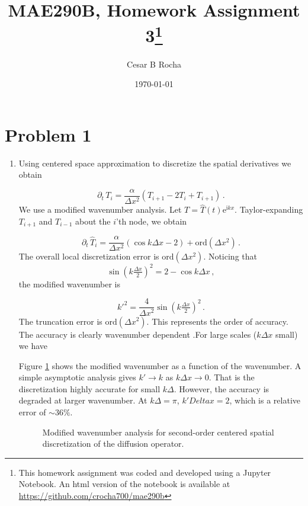 \documentclass[11pt]{article}
\title{MAE290B, Homework Assignment 3\footnote{This homework assignment was coded and developed using a Jupyter Notebook. An html version of the notebook is available at \href{https://github.com/crocha700/mae290b}{https://github.com/crocha700/mae290b}}}
\author{Cesar B Rocha}
\date{\today}
\newcommand{\ord}{\mbox{ord}}
\newcommand{\ii}{\mathrm{i}}
\newcommand{\ee}{\mathrm{e}}
\newcommand{\com}{\, ,}
\newcommand{\per}{\, .}
\def\beq{\begin{equation}}
\def\eeq{\end{equation}}
\begin{document}
\maketitle

\section*{Problem 1}

\begin{enumerate}[label=(\alph*)]

    \item Using centered space approximation to discretize the spatial derivatives we obtain

        \beq
            \label{diff_discret_space}
            \partial_t \,T_i = \frac{\alpha}{\Delta x^2}\left(T_{i+1}-2T_i + T_{i+1}\right)\per
        \eeq
        We use a modified wavenumber analysis. Let $T = \hat{T}(t)\ee^{\ii k x}$. Taylor-expanding $T_{i+1}$ and $T_{i-1}$  about the $i$'th node, we obtain 
      
        \beq
            \label{diff_discret_space_mod}
            \partial_t \,\hat{T}_i = \frac{\alpha}{\Delta x^2}\left(\cos k\Delta x - 2\right) + \ord{(\Delta x^2)}\per
        \eeq
        The overall local discretization error is $\ord{(\Delta x^2)}$. Noticing that
        \beq
        \sin \left(k \tfrac{\Delta x}{2}\right)^2 = 2 - \cos k \Delta x\com
        \eeq
        the modified wavenumber is

        \beq
            \label{mod_k}
            k'^2 = \frac{4}{\Delta x^2}\sin \left(k \tfrac{\Delta x}{2}\right)^2\per
        \eeq
        The truncation error is $\ord{(\Delta x^2)}$. This represents the order of accuracy. The accuracy is clearly wavenumber dependent .For large scales ($k \Delta x$ small) we have

        Figure \ref{fig_mod_k} shows the modified wavenumber as a function of the wavenumber. A simple asymptotic analysis gives  $k'\to k$ as $k\Delta x \to 0$. That is the discretization highly accurate for small $k\Delta$. However, the accuracy is degraded at larger wavenumber. At $k\Delta=\pi$, $k'Delta x= 2$, which is a relative error of $\sim36\%$.
    
\begin{figure}[ht]
\centerline{}
\caption{Modified wavenumber analysis for second-order centered spatial discretization of the diffusion operator.}
    \label{fig_mod_k}
\end{figure}


\end{enumerate}
\end{document}

